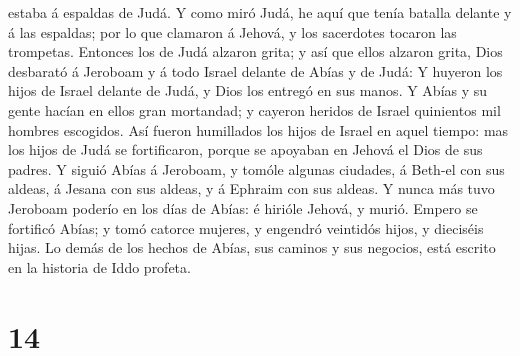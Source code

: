 estaba á espaldas de Judá.  Y como miró Judá, he aquí que
tenía batalla delante y á las espaldas; por lo que clamaron á Jehová, y
los sacerdotes tocaron las trompetas.  Entonces los de
Judá alzaron grita; y así que ellos alzaron grita, Dios desbarató á
Jeroboam y á todo Israel delante de Abías y de Judá:  Y
huyeron los hijos de Israel delante de Judá, y Dios los entregó en sus
manos.  Y Abías y su gente hacían en ellos gran
mortandad; y cayeron heridos de Israel quinientos mil hombres escogidos.
 Así fueron humillados los hijos de Israel en aquel
tiempo: mas los hijos de Judá se fortificaron, porque se apoyaban en
Jehová el Dios de sus padres.  Y siguió Abías á Jeroboam,
y tomóle algunas ciudades, á Beth-el con sus aldeas, á Jesana con sus
aldeas, y á Ephraim con sus aldeas.  Y nunca más tuvo
Jeroboam poderío en los días de Abías: é hirióle Jehová, y murió.
 Empero se fortificó Abías; y tomó catorce mujeres, y
engendró veintidós hijos, y dieciséis hijas.  Lo demás de
los hechos de Abías, sus caminos y sus negocios, está escrito en la
historia de Iddo profeta.

\hypertarget{section-13}{%
\section{14}\label{section-13}}

